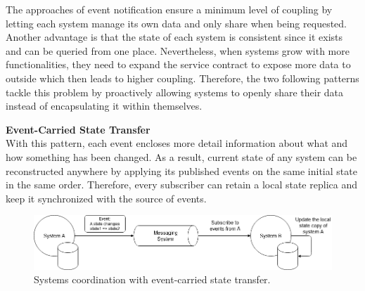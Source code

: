 The approaches of event notification ensure a minimum level of coupling by letting each system manage its own data and only share when being requested. Another advantage is that the state of each system is consistent since it exists and can be queried from one place. Nevertheless, when systems grow with more functionalities, they need to expand the service contract to expose more data to outside which then leads to higher coupling. Therefore, the two following patterns tackle this problem by proactively allowing systems to openly share their data instead of encapsulating it within themselves.

\textbf{Event-Carried State Transfer}\\
With this pattern, each event encloses more detail information about what and how something has been changed. As a result, current state of any system can be reconstructed anywhere by applying its published events on the same initial state in the same order. Therefore, every subscriber can retain a local state replica and keep it synchronized with the source of events.

\begin{figure}[h]
	\includegraphics[width=\linewidth]{images/eventstatetransfer.png}
	\caption{Systems coordination with event-carried state transfer.}
	\label{fig:eventstatetransfer}
\end{figure}

